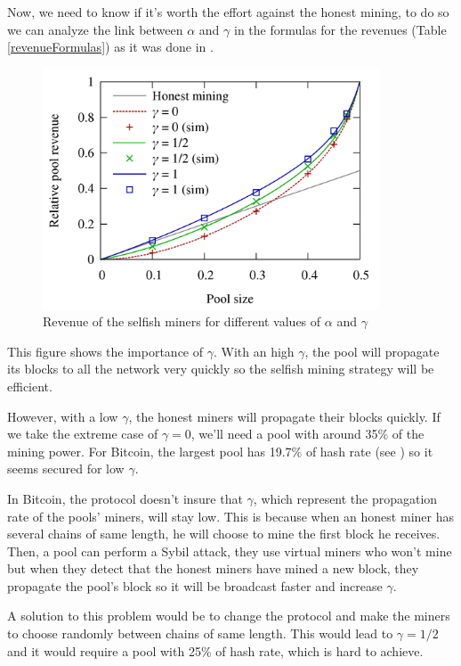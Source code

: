 Now, we need to know if it's worth the effort against the honest mining, to do so we can analyze the link between $\alpha$ and $\gamma$ in the formulas for the revenues (Table \ref{revenueFormulas}) as it was done in \cite{majority_not_enough}. \newline

\begin{figure}[ht]
\centering
\includegraphics[width=10cm]{Figures/poolRevenue}
\caption{Revenue of the selfish miners for different values of $\alpha$ and $\gamma$}
\end{figure}
\medskip

This figure shows the importance of $\gamma$. With an high $\gamma$, the pool will propagate its blocks to all the network very quickly so the selfish mining strategy will be efficient.

However, with a low $\gamma$, the honest miners will propagate their blocks quickly. If we take the extreme case of $\gamma = 0$, we'll need a pool with around 35\% of the mining power. For Bitcoin, the largest pool has 19.7\% of hash rate (see \cite{hashrate_pools}) so it seems secured for low $\gamma$.\newline

In Bitcoin, the protocol doesn't insure that $\gamma$, which represent the propagation rate of the pools' miners, will stay low. This is because when an honest miner has several chains of same length, he will choose to mine the first block he receives. Then, a pool can perform a Sybil attack, they use virtual miners who won't mine but when they detect that the honest miners have mined a new block, they propagate the pool's block so it will be broadcast faster and increase $\gamma$. \newline

A solution to this problem would be to change the protocol and make the miners to choose randomly between chains of same length. This would lead to $\gamma = 1/2$ and it would require a pool with 25\% of hash rate, which is hard to achieve.
